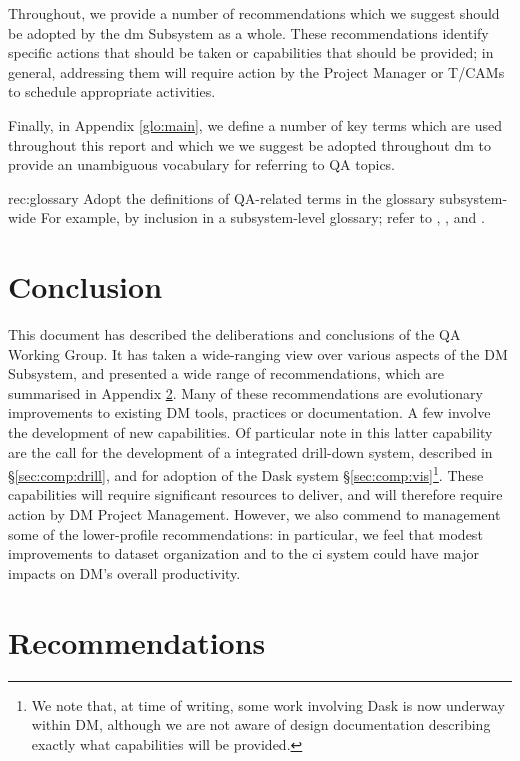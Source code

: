 \documentclass[DM,authoryear,toc,lsstdraft]{lsstdoc}
\makeatletter
\newcommand{\printrecs}{%
  \section{Recommendations}%
  \label{sec:recs}
  \begin{enumerate}[leftmargin=7em,label=QAWG-REC-\arabic*:]%
  \def\@noitemerr{\@latex@warning{Empty objective list}}%
  \@starttoc{rec}%
  \end{enumerate}%
}
\makeatother
\begin{document}
Throughout, we provide a number of recommendations which we suggest should be
adopted by the \gls{dm} Subsystem as a whole. These recommendations identify
specific actions that should be taken or capabilities that should be provided;
in general, addressing them will require action by the Project Manager or
T/CAMs to schedule appropriate activities.

Finally, in Appendix \ref{glo:main}, we define a number of key terms which are
used throughout this report and which we we suggest be adopted throughout
\gls{dm} to provide an unambiguous vocabulary for referring to QA topics.

\begin{recommendation}
    {rec:glossary}
    {Adopt the definitions of QA-related terms in the  glossary subsystem-wide}
For example, by inclusion in a subsystem-level glossary; refer to
, , and .
\end{recommendation}





\section{Conclusion}

This document has described the deliberations and conclusions of the QA Working Group.
It has taken a wide-ranging view over various aspects of the DM Subsystem, and presented a wide range of recommendations, which are summarised in Appendix \ref{sec:recs}.
Many of these recommendations are evolutionary improvements to existing DM tools, practices or documentation.
A few involve the development of new capabilities.
Of particular note in this latter capability are the call for the development of a integrated drill-down system, described in \S\ref{sec:comp:drill}, and for adoption of the Dask system \S\ref{sec:comp:vis}\footnote{We note that, at time of writing, some work involving Dask is now underway within DM, although we are not aware of design documentation describing exactly what capabilities will be provided.}.
These capabilities will require significant resources to deliver, and will therefore require action by DM Project Management.
However, we also commend to management some of the lower-profile recommendations: in particular, we feel that modest improvements to dataset organization and to the \gls{ci} system could have major impacts on DM's overall productivity.

\appendix
\printrecs
\glsaddall
\renewcommand*{\glsautoprefix}{glo:}
\printglossary[style=index,numberedsection=autolabel]


\end{document}
